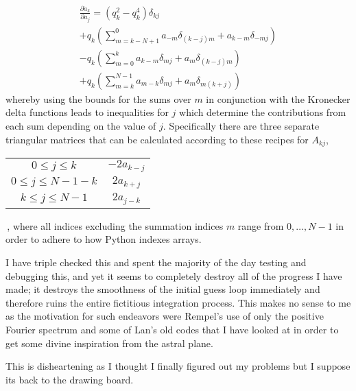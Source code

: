 \begin{description}
{\begin{description}
\begin{multline*}
\frac{\partial \dot{a}_k}{\partial a_j}=(q_k^2 - q_k^4)\delta_{kj} \\
+ q_k \left( \sum_{m=k-N+1}^{0} a_{-m} \delta_{(k-j)m} + a_{k-m} \delta_{-mj}\right)\\
-q_k \left(\sum_{m=0}^{k} a_{k-m} \delta_{mj} + a_m \delta_{(k-j)m} \right)\\
+q_k \left(\sum_{m=k}^{N-1} a_{m-k} \delta_{mj} + a_m \delta_{m(k+j)}\right)
\end{multline*}
whereby using the bounds for the sums over $m$ in conjunction with the
Kronecker delta functions leads to inequalities for $j$ which determine
the contributions from each sum depending on the value of $j$.
Specifically there are three separate triangular matrices that can be
calculated according to these recipes for $A_{kj}$,
\beq
\begin{tabular}{|c|c|}
\hline
$0 \leq j \leq k $ & $-2 a_{k-j}$ \\
$0 \leq j \leq N-1-k $ & $2 a_{k+j}$ \\
$k \leq j \leq N-1 $ &  $2 a_{j-k} $ \\
\hline
\end{tabular}
\,,
\eeq
where all indices excluding the summation indices $m$ range from $0,
\ldots, N-1$ in order to adhere to how Python indexes arrays.

I have triple checked this and spent the majority of the day testing and
debugging this, and yet it seems to completely destroy all of the
progress I have made; it destroys the smoothness of the initial guess
loop immediately and therefore ruins the entire fictitious integration
process. This makes no sense to me as the motivation for such endeavors
were Rempel's use of only the positive Fourier spectrum and
some of Lan's old codes that I have looked at in order to get some divine
inspiration from the astral plane.

This is disheartening as I thought I finally figured out my problems but
I suppose its back to the drawing board.
\end{description}
}

\end{description}
